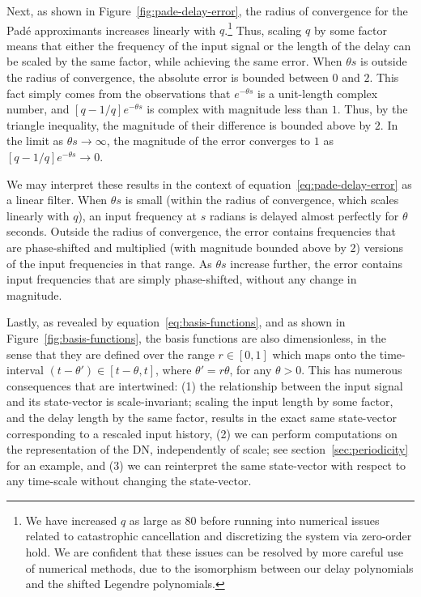 Next, as shown in Figure~\ref{fig:pade-delay-error}, the radius of convergence for the Pad\'e approximants increases linearly with $q$.\footnote{%
We have increased $q$ as large as $80$ before running into numerical issues related to catastrophic cancellation and discretizing the system via zero-order hold.
We are confident that these issues can be resolved by more careful use of numerical methods, due to the isomorphism between our delay polynomials and the shifted Legendre polynomials.}
Thus, scaling $q$ by some factor means that either the frequency of the input signal or the length of the delay can be scaled by the same factor, while achieving the same error.
When $\theta s$ is outside the radius of convergence, the absolute error is bounded between $0$ and $2$.
This fact simply comes from the observations that $e^{-\theta s}$ is a unit-length complex number, and $[q-1/q]e^{-\theta s}$ is complex with magnitude less than $1$.
Thus, by the triangle inequality, the magnitude of their difference is bounded above by $2$.
In the limit as $\theta s \rightarrow \infty$, the magnitude of the error converges to $1$ as $[q-1/q]e^{-\theta s} \rightarrow 0$.

We may interpret these results in the context of equation~\ref{eq:pade-delay-error} as a linear filter.
When $\theta s$ is small (within the radius of convergence, which scales linearly with $q$), an input frequency at $s$ radians is delayed almost perfectly for $\theta$ seconds.
Outside the radius of convergence, the error contains frequencies that are phase-shifted and multiplied (with magnitude bounded above by $2$) versions of the input frequencies in that range.
As $\theta s$ increase further, the error contains input frequencies that are simply phase-shifted, without any change in magnitude.

Lastly, as revealed by equation~\ref{eq:basis-functions}, and as shown in Figure~\ref{fig:basis-functions}, the basis functions are also dimensionless, in the sense that they are defined over the range $r \in [0, 1]$ which maps onto the time-interval $(t - \theta') \in [t - \theta, t]$, where $\theta' = r \theta$, for any $\theta > 0$.
This has numerous consequences that are intertwined: (1) the relationship between the input signal and its state-vector is scale-invariant; scaling the input length by some factor, and the delay length by the same factor, results in the exact same state-vector corresponding to a rescaled input history, (2) we can perform computations on the representation of the DN, independently of scale; see section~\ref{sec:periodicity} for an example, and (3) we can reinterpret the same state-vector with respect to any time-scale without changing the state-vector.

